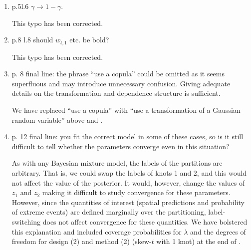\documentclass[11pt]{article}
\begin{document}
\begin{enumerate}[1.]
  \item p.5l.6 $\gamma \rightarrow 1 - \gamma$. \\

  \begin{response}
    This typo has been corrected.
  \end{response}

  \item p.8 l.8 should $w_{t,1}$ etc. be bold? \\

  \begin{response}
    This typo has been corrected.
  \end{response}

  \item p. 8 final line: the phrase ``use a copula'' could be omitted as it seems superfluous and may introduce unnecessary confusion. Giving adequate details on the transformation and dependence structure is sufficient. \\

  \begin{response}
    We have replaced ``use a copula'' with ``use a transformation of a Gaussian random variable'' above  and .
  \end{response}

  \item p. 12 final line: you fit the correct model in some of these cases, so is it still difficult to tell whether the parameters converge even in this situation? \\

  \begin{response}
    As with any Bayesian mixture model, the labels of the partitions are arbitrary.
    That is, we could swap the labels of knots 1 and 2, and this would not affect the value of the posterior.
    It would, however, change the values of $z_1$ and $z_2$ making it difficult to study convergence for these parameters.
    However, since the quantities of interest (spatial predictions and probability of extreme events) are defined marginally over the partitioning, label-switching does not affect convergence for these quantities.
    We have bolstered this explanation and included coverage probabilities for $\lambda$ and the degrees of freedom for design (2) and method (2) (skew-$t$ with 1 knot) at the end of .
  \end{response}


\end{enumerate}
\end{document}
